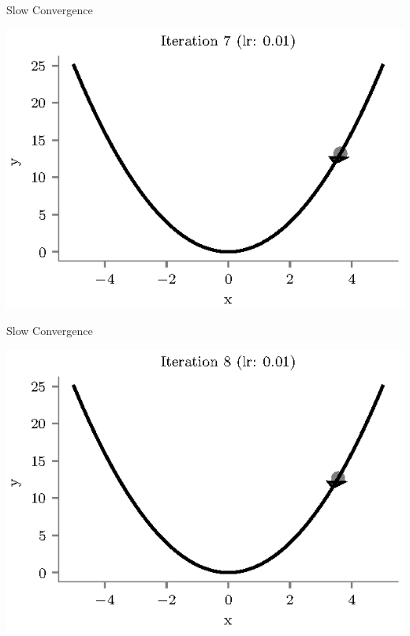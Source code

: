 \documentclass{beamer}
\begin{document}
\begin{frame}{Slow Convergence}
\begin{center}
\includegraphics[totalheight=6cm]{undershooting-7.eps}
\end{center}
\end{frame}

\begin{frame}{Slow Convergence}
\begin{center}
\includegraphics[totalheight=6cm]{undershooting-8.eps}
\end{center}
\end{frame}
\end{document}
